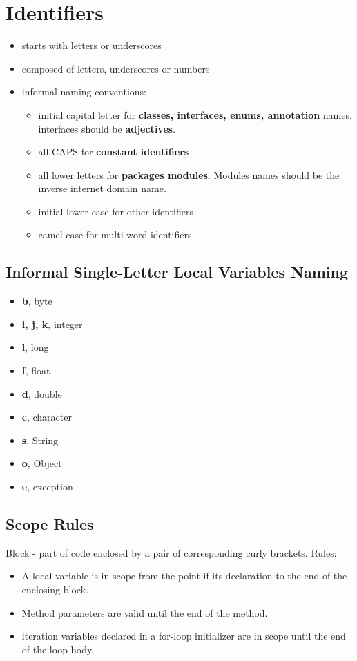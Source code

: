 \documentclass{report}
\begin{document}
\section{Identifiers}
\begin{itemize}
\item starts with letters or underscores
\item composed of letters, underscores or numbers
\item informal naming conventions:
\begin{itemize}
\item initial capital letter for \textbf{classes, interfaces, enums, annotation} names. interfaces should be \textbf{adjectives}.
\item all-CAPS for \textbf{constant identifiers}
\item all lower letters for \textbf{packages modules}. Modules names should be the inverse internet domain name.
\item initial lower case for other identifiers
\item camel-case for multi-word identifiers
\end{itemize}
\end{itemize}

\subsection*{Informal Single-Letter Local Variables Naming}
\begin{itemize}
	\item \textbf{b}, byte
	\item \textbf{i, j, k}, integer
	\item \textbf{l}, long
	\item \textbf{f}, float
	\item \textbf{d}, double
	\item \textbf{c}, character
	\item  \textbf{s}, String
	\item \textbf{o}, Object
	\item \textbf{e}, exception
\end{itemize}

\subsection{Scope Rules}
Block - part of code enclosed by a pair of corresponding curly brackets. Rules:
\begin{itemize}
\item A local variable is in scope from the point if its declaration to the end of the enclosing block.
\item Method parameters are valid until the end of the method.
\item iteration variables declared in a for-loop initializer are in scope until the end of the loop body.
\end{itemize}
\end{document}
